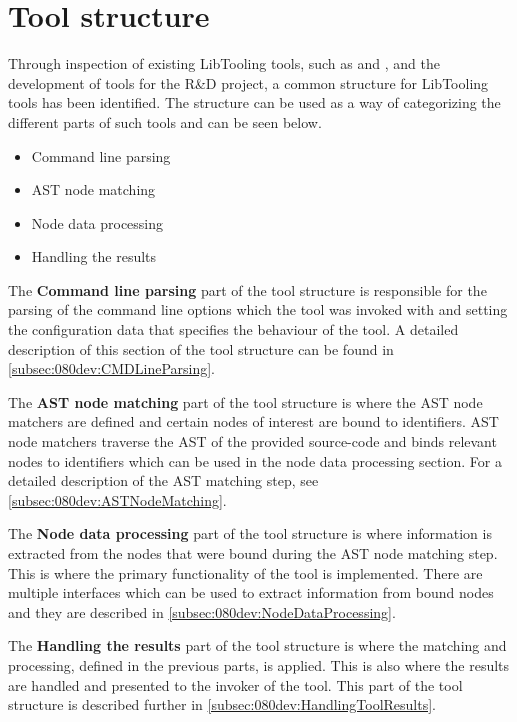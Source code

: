\section{Tool structure} \label{sec:080dev:tool_structure}

Through inspection of existing LibTooling tools, such as \cite{clangExternalClangExamples} and \cite{llvmLLVMCompilerInfrastructure2023}, and the development of tools for the R\&D project, a common structure for LibTooling tools has been identified. The structure can be used as a way of categorizing the different parts of such tools and can be seen below.
\vspace*{-0.75em}
\begin{itemize}
    \item Command line parsing
    \item AST node matching
    \item Node data processing
    \item Handling the results
\end{itemize}
\vspace*{-0.75em}
The \textbf{Command line parsing} part of the tool structure is responsible for the parsing of the command line options which the tool was invoked with and setting the configuration data that specifies the behaviour of the tool. A detailed description of this section of the tool structure can be found in \cref{subsec:080dev:CMDLineParsing}.

The \textbf{AST node matching} part of the tool structure is where the AST node matchers are defined and certain nodes of interest are bound to identifiers. AST node matchers traverse the AST of the provided source-code and binds relevant nodes to identifiers which can be used in the node data processing section. For a detailed description of the AST matching step, see \cref{subsec:080dev:ASTNodeMatching}.

The \textbf{Node data processing} part of the tool structure is where information is extracted from the nodes that were bound during the AST node matching step. This is where the primary functionality of the tool is implemented. There are multiple interfaces which can be used to extract information from bound nodes and they are described in \cref{subsec:080dev:NodeDataProcessing}.

The \textbf{Handling the results} part of the tool structure is where the matching and processing, defined in the previous parts, is applied. This is also where the results are handled and presented to the invoker of the tool. This part of the tool structure is described further in \cref{subsec:080dev:HandlingToolResults}.


